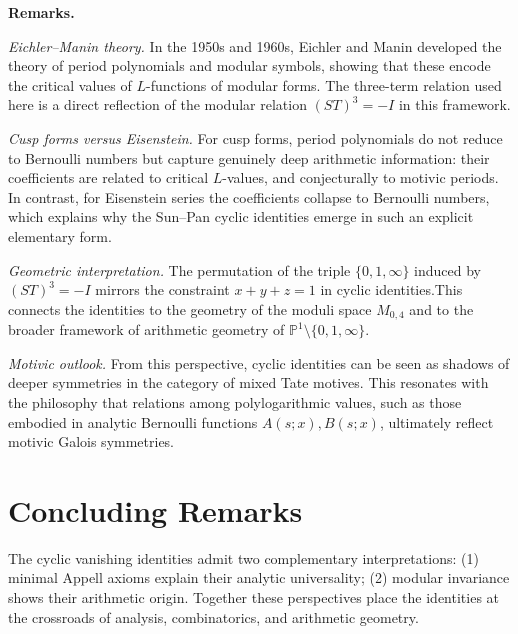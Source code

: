 \documentclass[12pt]{article}
\numberwithin{equation}{section}
\begin{document}
\noindent\textbf{Remarks.}
\begin{itemize}
\item \emph{Eichler--Manin theory.}  
In the 1950s and 1960s, Eichler and Manin developed the theory of period
polynomials and modular symbols, showing that these encode the critical values
of $L$-functions of modular forms. The three-term relation used here is a
direct reflection of the modular relation $(ST)^3=-I$ in this framework.

\item \emph{Cusp forms versus Eisenstein.}  
For cusp forms, period polynomials do not reduce to Bernoulli numbers but
capture genuinely deep arithmetic information: their coefficients are related
to critical $L$-values, and conjecturally to motivic periods. In contrast,
for Eisenstein series the coefficients collapse to Bernoulli numbers, which
explains why the Sun--Pan cyclic identities emerge in such an explicit
elementary form.

\begin{sloppypar}
\item \emph{Geometric interpretation.} The permutation of the triple $\{0,1,\infty\}$
induced by $(ST)^3=-I$ mirrors the constraint $x+y+z=1$ in cyclic identities.This connects the
identities to the geometry of the moduli space $M_{0,4}$ and to the broader
framework of arithmetic geometry of $\mathbb{P}^1\setminus\{0,1,\infty\}$.
\end{sloppypar}

\item \emph{Motivic outlook.}  
From this perspective, cyclic identities can be seen as shadows of deeper
symmetries in the category of mixed Tate motives. This resonates with the
philosophy that relations among polylogarithmic values, such as those
embodied in analytic Bernoulli functions $A(s;x), B(s;x)$, ultimately reflect
motivic Galois symmetries.
\end{itemize}


\section{Concluding Remarks}

The cyclic vanishing identities admit two complementary interpretations:
(1) minimal Appell axioms explain their analytic universality;
(2) modular invariance shows their arithmetic origin.  
Together these perspectives place the identities at the crossroads of
analysis, combinatorics, and arithmetic geometry.
\end{document}
